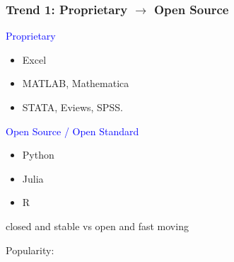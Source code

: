 \documentclass[
    xcolor={svgnames,dvipsnames},
    hyperref={colorlinks, citecolor=DeepPink4, linkcolor=DarkRed, urlcolor=DarkBlue}
    ]{beamer}  %
\newcommand{\blue}[1]{\textcolor{Blue}{\sf #1}}
\newcommand{\1}{\mathbbm 1}
\begin{document}
\begin{frame}
    \frametitle{Trend 1: Proprietary $\to$ Open Source}
    
    \blue{Proprietary} 
    \begin{itemize}
        \item Excel
        \item MATLAB, Mathematica
        \item STATA, Eviews, SPSS.
    \end{itemize}
    

    \vspace{0.5em}
    \vspace{0.5em}
    \blue{Open Source / Open Standard} 
    
    \begin{itemize}
        \item Python
        \item Julia
        \item R
    \end{itemize}


    \begin{center}
        closed and stable vs open and fast moving
    \end{center}

\end{frame}


\begin{frame}

    Popularity:

    \begin{figure}
       \begin{center}
       \end{center}
    \end{figure}

\end{frame}
\end{document}
